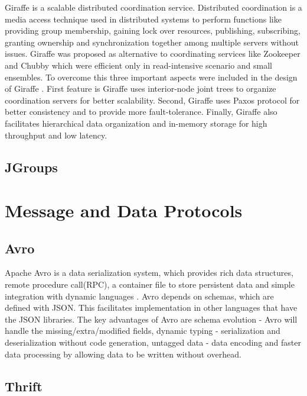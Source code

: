      Giraffe is a scalable distributed coordination
     service. Distributed coordination is a media access technique
     used in distributed systems to perform functions like providing
     group membership, gaining lock over resources, publishing,
     subscribing, granting ownership and synchronization together
     among multiple servers without issues. Giraffe was proposed as
     alternative to coordinating services like Zookeeper and Chubby
     which were efficient only in read-intensive scenario and small
     ensembles. To overcome this three important aspects were included
     in the design of Giraffe \cite{giraffePaper}. First feature is
     Giraffe uses interior-node joint trees to organize coordination
     servers for better scalability. Second, Giraffe uses Paxos
     protocol for better consistency and to provide more
     fault-tolerance. Finally, Giraffe also facilitates hierarchical
     data organization and in-memory storage for high throughput and
     low latency.
     
\subsection{ JGroups}

\section{Message and Data Protocols}


\subsection{ Avro}

     Apache Avro is a data serialization system, which provides rich
     data structures, remote procedure call(RPC), a container file to
     store persistent data and simple integration with dynamic
     languages \cite{www-Avro}.  Avro depends on schemas, which are
     defined with JSON. This facilitates implementation in other
     languages that have the JSON libraries.  The key advantages of
     Avro are schema evolution - Avro will handle the
     missing/extra/modified fields, dynamic typing - serialization and
     deserialization without code generation, untagged data - data
     encoding and faster data processing by allowing data to be
     written without overhead.
     
\subsection{ Thrift}

